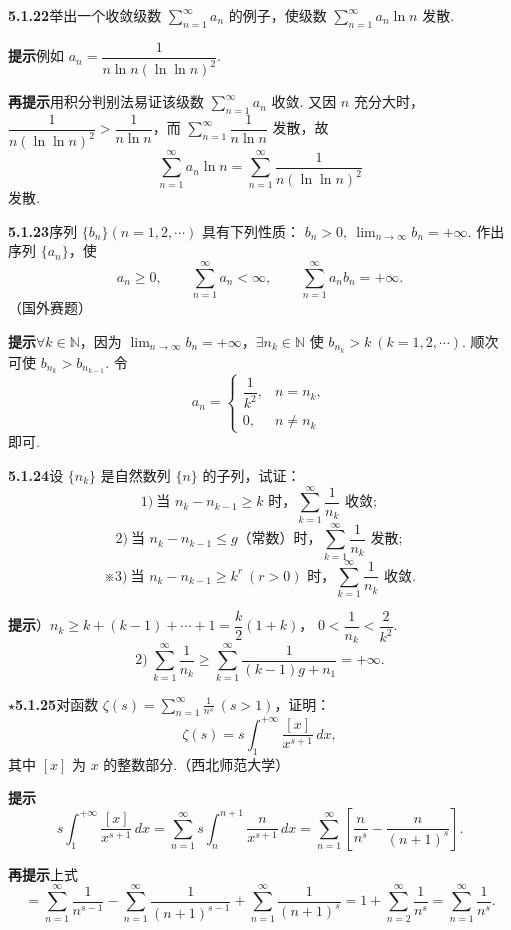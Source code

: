 \documentclass[UTF8,12pt,a4paper,fontset=fandol]{ctexart}
\begin{document}
\noindent\textbf{5.1.22}\quad 举出一个收敛级数 $\displaystyle\sum_{n=1}^{\infty}a_n$ 的例子，使级数
$\displaystyle\sum_{n=1}^{\infty}a_n\ln n$ 发散.

\noindent\textbf{提示}\quad 例如 $a_n=\dfrac1{n\ln n(\ln\ln n)^2}$.

\noindent\textbf{再提示}\quad 用积分判别法易证该级数 $\displaystyle\sum_{n=1}^{\infty}a_n$ 收敛. 又因 $n$ 充分大时，
$\dfrac1{n(\ln\ln n)^2}>\dfrac1{n\ln n}$，而
$\displaystyle\sum_{n=1}^{\infty}\dfrac1{n\ln n}$ 发散，故
\[
  \sum_{n=1}^{\infty}a_n\ln n
  =\sum_{n=1}^{\infty}\frac1{n(\ln\ln n)^2}
\]
发散.

\noindent\textbf{5.1.23}\quad 序列 $\{b_n\}(n=1,2,\cdots)$ 具有下列性质：
$b_n>0,\ \lim_{n\to\infty}b_n=+\infty$. 作出序列 $\{a_n\}$，使
\[
  a_n\ge0,\qquad \sum_{n=1}^{\infty}a_n<\infty,\qquad
  \sum_{n=1}^{\infty}a_nb_n=+\infty.
\]
（国外赛题）

\noindent\textbf{提示}\quad $\forall k\in\mathbb N$，因为
$\lim_{n\to\infty}b_n=+\infty$，$\exists n_k\in\mathbb N$ 使
$b_{n_k}>k\ (k=1,2,\cdots)$. 顺次可使 $b_{n_k}>b_{n_{k-1}}$. 令
\[
  a_n=
  \begin{cases}
  \dfrac1{k^2}, & n=n_k,\\
  0, & n\ne n_k
  \end{cases}
\]
即可.

\noindent\textbf{5.1.24}\quad 设 $\{n_k\}$ 是自然数列 $\{n\}$ 的子列，试证：
\[
  1)\ \text{当 }n_k-n_{k-1}\ge k\text{ 时，}\sum_{k=1}^{\infty}\frac1{n_k}\text{ 收敛};
\]
\[
  2)\ \text{当 }n_k-n_{k-1}\le g\text{（常数）时，}\sum_{k=1}^{\infty}\frac1{n_k}\text{ 发散};
\]
\[
  ※3)\ \text{当 }n_k-n_{k-1}\ge k^r\ (r>0)\text{ 时，}\sum_{k=1}^{\infty}\frac1{n_k}\text{ 收敛}.
\]

\noindent\textbf{提示}）$n_k\ge k+(k-1)+\cdots+1=\dfrac{k}{2}(1+k)$，
$0<\dfrac1{n_k}<\dfrac2{k^2}$.
\[
  2)\ \sum_{k=1}^{\infty}\frac1{n_k}
  \ge\sum_{k=1}^{\infty}\frac1{(k-1)g+n_1}=+\infty.
\]

\noindent\textbf{$\star$5.1.25}\quad 对函数
$\displaystyle\zeta(s)=\sum_{n=1}^{\infty}\frac1{n^s}\ (s>1)$，证明：
\[
  \zeta(s)=s\int_1^{+\infty}\frac{[x]}{x^{s+1}}\,dx,
\]
其中 $[x]$ 为 $x$ 的整数部分.（西北师范大学）

\noindent\textbf{提示}\quad
\[
  s\int_1^{+\infty}\frac{[x]}{x^{s+1}}\,dx
  =\sum_{n=1}^{\infty}s\int_n^{n+1}\frac{n}{x^{s+1}}\,dx
  =\sum_{n=1}^{\infty}\left[\frac n{n^s}-\frac n{(n+1)^s}\right].
\]

\noindent\textbf{再提示}\quad 上式
\[
  =\sum_{n=1}^{\infty}\frac1{n^{s-1}}
   -\sum_{n=1}^{\infty}\frac1{(n+1)^{s-1}}
   +\sum_{n=1}^{\infty}\frac1{(n+1)^s}
  =1+\sum_{n=2}^{\infty}\frac1{n^s}
  =\sum_{n=1}^{\infty}\frac1{n^s}.
\]
\end{document}
